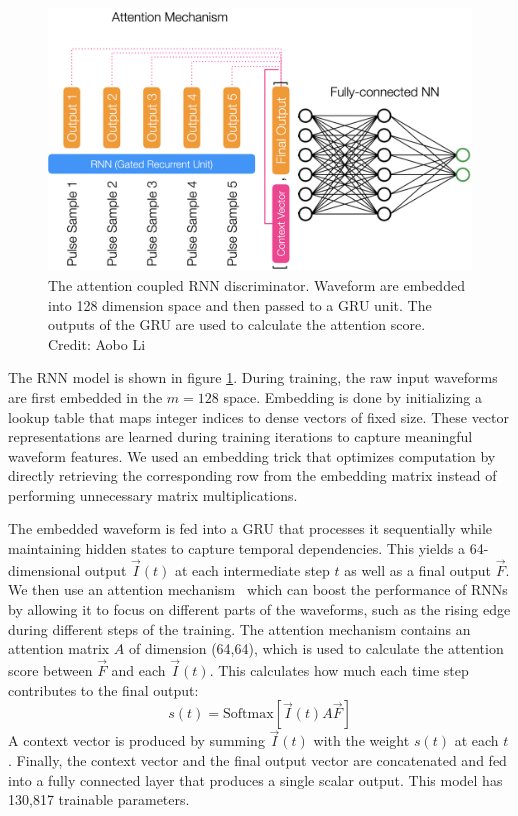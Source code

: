 \begin{figure}[htb!]
    \centering
    \includegraphics[width=0.8\linewidth,trim={0pc 0pc 0pc 0pc},clip]{ch6/figs/rnnAttention.png}
    \caption{The attention coupled RNN discriminator. Waveform are embedded into 128 dimension space and then passed to a GRU unit. The outputs of the GRU are used to calculate the attention score. Credit: Aobo Li}
    \label{ch6_fig_detail_network}
\end{figure}

The RNN model is shown in figure \ref{ch6_fig_detail_network}. During training, the raw input waveforms are first embedded in the $m=128$ space. Embedding is done by initializing a lookup table that maps integer indices to dense vectors of fixed size. These vector representations are learned during training iterations to capture meaningful waveform features. We used an embedding trick that optimizes computation by directly retrieving the corresponding row from the embedding matrix instead of performing unnecessary matrix multiplications. 

The embedded waveform is fed into a GRU that processes it sequentially while maintaining hidden states to capture temporal dependencies. This yields a 64-dimensional output $\vec{I}(t)$ at each intermediate step $t$ as well as a final output $\vec{F}$. We then use an attention mechanism~\cite{attention} which can boost the performance of RNNs by allowing it to focus on different parts of the waveforms, such as the rising edge during different steps of the training. The attention mechanism contains an attention matrix \( A \) of dimension (64,64), which is used to calculate the attention score between $\vec{F}$ and each $\vec{I}(t)$. This calculates how much each time step contributes to the final output:
\begin{equation}
    s(t) = \mathrm{Softmax}[\vec{I}(t) A \vec{F}]
\end{equation}
A context vector is produced by summing $\vec{I}(t)$ with the weight $s(t)$ at each $t$. Finally, the context vector and the final output vector are concatenated and fed into a fully connected layer that produces a single scalar output. This model has 130,817 trainable parameters.